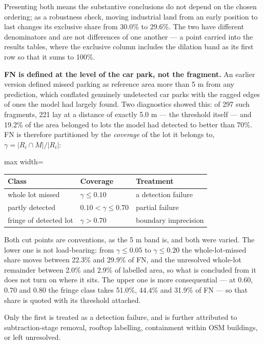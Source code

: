Presenting both means the substantive conclusions do not depend on the chosen ordering; as a robustness check, moving industrial land from an early position to last changes its exclusive share from 30.0\% to 29.6\%. The two have different denominators and are not differences of one another --- a point carried into the results tables, where the exclusive column includes the dilation band as its first row so that it sums to 100\%.

\textbf{FN is defined at the level of the car park, not the fragment.} An earlier version defined missed parking as reference area more than 5 m from any prediction, which conflated genuinely undetected car parks with the ragged edges of ones the model had largely found. Two diagnostics showed this: of 297 such fragments, 221 lay at a distance of exactly 5.0 m --- the threshold itself --- and 19.2\% of the area belonged to lots the model had detected to better than 70\%. FN is therefore partitioned by the \emph{coverage} of the lot it belongs to, \(\gamma = |R_i \cap M| / |R_i|\):

\begin{table}[htbp]
\centering
\begin{adjustbox}{max width=\textwidth}
\begin{tabular}{@{}lll@{}}
\toprule
Class & Coverage & Treatment \\
\midrule
whole lot missed & \(\gamma \le 0.10\) & a detection failure \\
partly detected & \(0.10 < \gamma \le 0.70\) & partial failure \\
fringe of detected lot & \(\gamma > 0.70\) & boundary imprecision \\
\bottomrule
\end{tabular}
\end{adjustbox}
\end{table}
\restoreparskip

Both cut points are conventions, as the 5 m band is, and both were varied. The lower one is not load-bearing: from \(\gamma \le 0.05\) to \(\gamma \le 0.20\) the whole-lot-missed share moves between 22.3\% and 29.9\% of FN, and the unresolved whole-lot remainder between 2.0\% and 2.9\% of labelled area, so what is concluded from it does not turn on where it sits. The upper one is more consequential --- at 0.60, 0.70 and 0.80 the fringe class takes 51.0\%, 44.4\% and 31.9\% of FN --- so that share is quoted with its threshold attached.

Only the first is treated as a detection failure, and is further attributed to subtraction-stage removal, rooftop labelling, containment within OSM buildings, or left unresolved.

